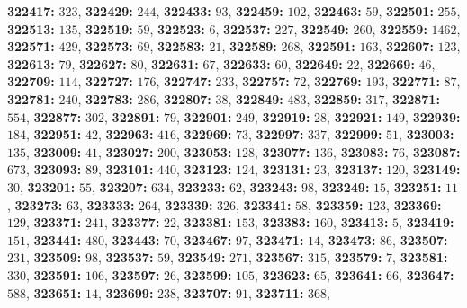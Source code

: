 \textsf{\bfseries 322417:} $323$, \textsf{\bfseries 322429:} $244$, \textsf{\bfseries 322433:} $93$, \textsf{\bfseries 322459:} $102$, \textsf{\bfseries 322463:} $59$, \textsf{\bfseries 322501:} $255$, \textsf{\bfseries 322513:} $135$, \textsf{\bfseries 322519:} $59$, \textsf{\bfseries 322523:} $6$, \textsf{\bfseries 322537:} $227$, \textsf{\bfseries 322549:} $260$, \textsf{\bfseries 322559:} $1462$, \textsf{\bfseries 322571:} $429$, \textsf{\bfseries 322573:} $69$, \textsf{\bfseries 322583:} $21$, \textsf{\bfseries 322589:} $268$, \textsf{\bfseries 322591:} $163$, \textsf{\bfseries 322607:} $123$, \textsf{\bfseries 322613:} $79$, \textsf{\bfseries 322627:} $80$, \textsf{\bfseries 322631:} $67$, \textsf{\bfseries 322633:} $60$, \textsf{\bfseries 322649:} $22$, \textsf{\bfseries 322669:} $46$, \textsf{\bfseries 322709:} $114$, \textsf{\bfseries 322727:} $176$, \textsf{\bfseries 322747:} $233$, \textsf{\bfseries 322757:} $72$, \textsf{\bfseries 322769:} $193$, \textsf{\bfseries 322771:} $87$, \textsf{\bfseries 322781:} $240$, \textsf{\bfseries 322783:} $286$, \textsf{\bfseries 322807:} $38$, \textsf{\bfseries 322849:} $483$, \textsf{\bfseries 322859:} $317$, \textsf{\bfseries 322871:} $554$, \textsf{\bfseries 322877:} $302$, \textsf{\bfseries 322891:} $79$, \textsf{\bfseries 322901:} $249$, \textsf{\bfseries 322919:} $28$, \textsf{\bfseries 322921:} $149$, \textsf{\bfseries 322939:} $184$, \textsf{\bfseries 322951:} $42$, \textsf{\bfseries 322963:} $416$, \textsf{\bfseries 322969:} $73$, \textsf{\bfseries 322997:} $337$, \textsf{\bfseries 322999:} $51$, \textsf{\bfseries 323003:} $135$, \textsf{\bfseries 323009:} $41$, \textsf{\bfseries 323027:} $200$, \textsf{\bfseries 323053:} $128$, \textsf{\bfseries 323077:} $136$, \textsf{\bfseries 323083:} $76$, \textsf{\bfseries 323087:} $673$, \textsf{\bfseries 323093:} $89$, \textsf{\bfseries 323101:} $440$, \textsf{\bfseries 323123:} $124$, \textsf{\bfseries 323131:} $23$, \textsf{\bfseries 323137:} $120$, \textsf{\bfseries 323149:} $30$, \textsf{\bfseries 323201:} $55$, \textsf{\bfseries 323207:} $634$, \textsf{\bfseries 323233:} $62$, \textsf{\bfseries 323243:} $98$, \textsf{\bfseries 323249:} $15$, \textsf{\bfseries 323251:} $11$, \textsf{\bfseries 323273:} $63$, \textsf{\bfseries 323333:} $264$, \textsf{\bfseries 323339:} $326$, \textsf{\bfseries 323341:} $58$, \textsf{\bfseries 323359:} $123$, \textsf{\bfseries 323369:} $129$, \textsf{\bfseries 323371:} $241$, \textsf{\bfseries 323377:} $22$, \textsf{\bfseries 323381:} $153$, \textsf{\bfseries 323383:} $160$, \textsf{\bfseries 323413:} $5$, \textsf{\bfseries 323419:} $151$, \textsf{\bfseries 323441:} $480$, \textsf{\bfseries 323443:} $70$, \textsf{\bfseries 323467:} $97$, \textsf{\bfseries 323471:} $14$, \textsf{\bfseries 323473:} $86$, \textsf{\bfseries 323507:} $231$, \textsf{\bfseries 323509:} $98$, \textsf{\bfseries 323537:} $59$, \textsf{\bfseries 323549:} $271$, \textsf{\bfseries 323567:} $315$, \textsf{\bfseries 323579:} $7$, \textsf{\bfseries 323581:} $330$, \textsf{\bfseries 323591:} $106$, \textsf{\bfseries 323597:} $26$, \textsf{\bfseries 323599:} $105$, \textsf{\bfseries 323623:} $65$, \textsf{\bfseries 323641:} $66$, \textsf{\bfseries 323647:} $588$, \textsf{\bfseries 323651:} $14$, \textsf{\bfseries 323699:} $238$, \textsf{\bfseries 323707:} $91$, \textsf{\bfseries 323711:} $368$, 
